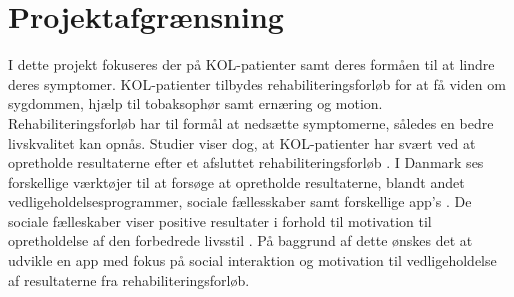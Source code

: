 \newpage

\section{Projektafgrænsning}
I dette projekt fokuseres der på KOL-patienter samt deres formåen til at lindre deres symptomer. KOL-patienter tilbydes rehabiliteringsforløb for at få viden om sygdommen, hjælp til tobaksophør samt ernæring og motion. Rehabiliteringsforløb har til formål at nedsætte symptomerne, således en bedre livskvalitet kan opnås.\cite{Lungeforeningen2016,McCarthy2015,Habraken2011,Sundhedsstyrelsen2015} Studier viser dog, at KOL-patienter har svært ved at opretholde resultaterne efter et afsluttet rehabiliteringsforløb \cite{Egan2012,Beachamp2013,Zanaboni2017,Ringbaek2008}. I Danmark ses forskellige værktøjer til at forsøge at opretholde resultaterne, blandt andet vedligeholdelsesprogrammer, sociale fællesskaber samt forskellige app's \cite{Sundhedsstyrelsen2015,HealthcareDenmark2017}. De sociale fælleskaber viser positive resultater i forhold til motivation til opretholdelse af den forbedrede livsstil \cite{dsam2016}.
På baggrund af dette ønskes det at udvikle en app med fokus på social interaktion og motivation til vedligeholdelse af resultaterne fra rehabiliteringsforløb. 
